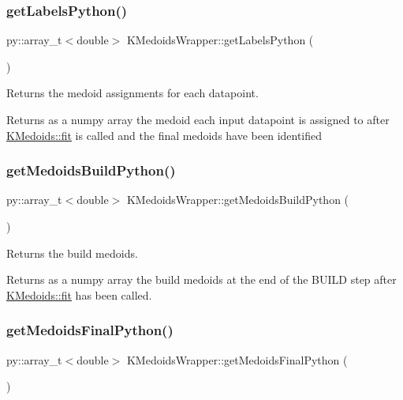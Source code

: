 \subsubsection{\texorpdfstring{get\+Labels\+Python()}{getLabelsPython()}}
{\footnotesize\ttfamily py\+::array\+\_\+t$<$double$>$ K\+Medoids\+Wrapper\+::get\+Labels\+Python (\begin{DoxyParamCaption}{ }\end{DoxyParamCaption})\hspace{0.3cm}{\ttfamily [inline]}}



Returns the medoid assignments for each datapoint. 

Returns as a numpy array the medoid each input datapoint is assigned to after \hyperlink{classKMedoids_ae241800e72a6b4a677333ffbf06e1798}{K\+Medoids\+::fit} is called and the final medoids have been identified \mbox{\label{classKMedoidsWrapper_af272debff6f3b31490d20b8dc7bec322}} 
\subsubsection{\texorpdfstring{get\+Medoids\+Build\+Python()}{getMedoidsBuildPython()}}
{\footnotesize\ttfamily py\+::array\+\_\+t$<$double$>$ K\+Medoids\+Wrapper\+::get\+Medoids\+Build\+Python (\begin{DoxyParamCaption}{ }\end{DoxyParamCaption})\hspace{0.3cm}{\ttfamily [inline]}}



Returns the build medoids. 

Returns as a numpy array the build medoids at the end of the B\+U\+I\+LD step after \hyperlink{classKMedoids_ae241800e72a6b4a677333ffbf06e1798}{K\+Medoids\+::fit} has been called. \mbox{\label{classKMedoidsWrapper_ae825241c43b8bf92912eb59cd12ae1c5}} 
\subsubsection{\texorpdfstring{get\+Medoids\+Final\+Python()}{getMedoidsFinalPython()}}
{\footnotesize\ttfamily py\+::array\+\_\+t$<$double$>$ K\+Medoids\+Wrapper\+::get\+Medoids\+Final\+Python (\begin{DoxyParamCaption}{ }\end{DoxyParamCaption})\hspace{0.3cm}{\ttfamily [inline]}}



